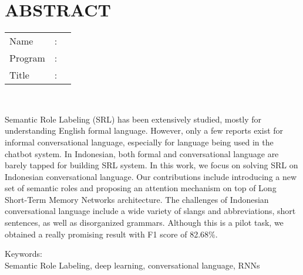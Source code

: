 %
%
%

\chapter*{ABSTRACT}

\vspace*{0.2cm}

\noindent \begin{tabular}{l l p{11.0cm}}
	Name&: & \penulis \\
	Program&: & \programEng \\
	Title&: & \judulInggris \\
\end{tabular} \\ 

\vspace*{0.5cm}

\noindent 

Semantic Role Labeling (SRL) has been extensively studied, mostly for understanding English formal language. However, only a few reports exist for informal conversational language, especially for language being used in the chatbot system. In Indonesian, both formal and conversational language are barely tapped for building SRL system. In this work, we focus on solving SRL on Indonesian conversational language. Our contributions include introducing a new set of semantic roles and proposing an attention mechanism on top of Long Short-Term Memory Networks architecture. The challenges of Indonesian conversational language include a wide variety of slangs and abbreviations, short sentences, as well as disorganized grammars. Although this is a pilot task, we obtained a really promising result with F1 score of 82.68\%.

\vspace*{0.2cm}

\noindent Keywords: \\ 
\noindent Semantic Role Labeling, deep learning, conversational language, RNNs \\ 

\newpage